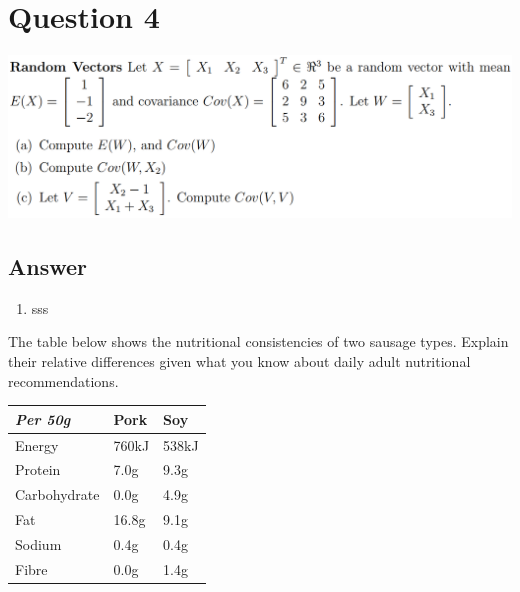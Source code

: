 \documentclass[
	12pt, %
]{fphw}
\begin{document}
\section*{Question 4}

\begin{problem}
    \includegraphics[width=440pt]{img/q4.png}
\end{problem}


\subsection*{Answer}
\begin{enumerate}
    \item sss 
\end{enumerate}
	The table below shows the nutritional consistencies of two sausage types. Explain their relative differences given what you know about daily adult nutritional recommendations.
	
	\bigskip
    
	\begin{center}
		\begin{tabular}{l l l}
			\toprule
			\textit{Per 50g} & Pork & Soy \\
			\midrule
			Energy & 760kJ & 538kJ\\
			Protein & 7.0g & 9.3g\\
			Carbohydrate & 0.0g & 4.9g\\
			Fat & 16.8g & 9.1g\\
			Sodium & 0.4g & 0.4g\\
			Fibre & 0.0g & 1.4g\\
			\bottomrule
		\end{tabular}
	\end{center}
	
	\medskip


\clearpage
\end{document}
